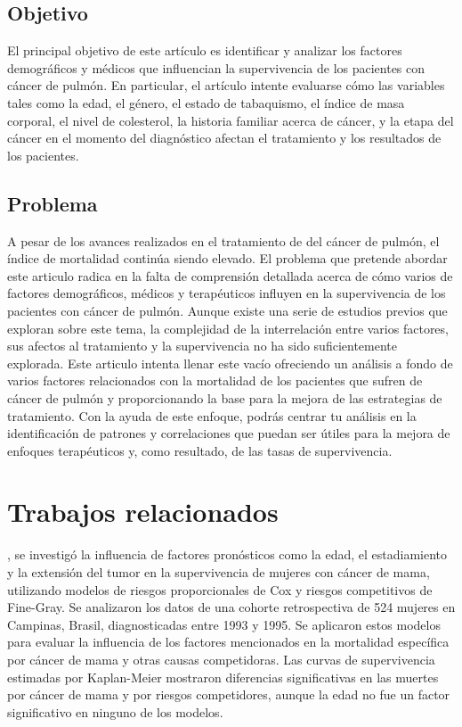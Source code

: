 \documentclass[10pt,journal,compsoc]{IEEEtran}
\begin{document}
\subsection{Objetivo}
El principal objetivo de este artículo es identificar y analizar los factores demográficos y médicos que influencian la supervivencia de los pacientes con cáncer de pulmón. En particular, el artículo intente evaluarse cómo las variables tales como la edad, el género, el estado de tabaquismo, el índice de masa corporal, el nivel de colesterol, la historia familiar acerca de cáncer, y la etapa del cáncer en el momento del diagnóstico afectan el tratamiento y los resultados de los pacientes.

\subsection{Problema}
A pesar de los avances realizados en el tratamiento de del cáncer de pulmón, el índice de mortalidad continúa siendo elevado. El problema que pretende abordar este articulo radica en la falta de comprensión detallada acerca de cómo varios de factores demográficos, médicos y terapéuticos influyen en la supervivencia de los pacientes con cáncer de pulmón. Aunque existe una serie de estudios previos que exploran sobre este tema, la complejidad de la interrelación entre varios factores, sus afectos al tratamiento y la supervivencia no ha sido suficientemente explorada. Este articulo intenta llenar este vacío ofreciendo un análisis a fondo de varios factores relacionados con la mortalidad de los pacientes que sufren de cáncer de pulmón y proporcionando la base para la mejora de las estrategias de tratamiento. Con la ayuda de este enfoque, podrás centrar tu análisis en la identificación de patrones y correlaciones que puedan ser útiles para la mejora de enfoques terapéuticos y, como resultado, de las tasas de supervivencia.


\section{Trabajos relacionados}

\citet{ferraz2017}, se investigó la influencia de factores pronósticos como la edad, el estadiamiento y la extensión del tumor en la supervivencia de mujeres con cáncer de mama, utilizando modelos de riesgos proporcionales de Cox y riesgos competitivos de Fine-Gray. Se analizaron los datos de una cohorte retrospectiva de 524 mujeres en Campinas, Brasil, diagnosticadas entre 1993 y 1995. Se aplicaron estos modelos para evaluar la influencia de los factores mencionados en la mortalidad específica por cáncer de mama y otras causas competidoras. Las curvas de supervivencia estimadas por Kaplan-Meier mostraron diferencias significativas en las muertes por cáncer de mama y por riesgos competidores, aunque la edad no fue un factor significativo en ninguno de los modelos.
\end{document}
